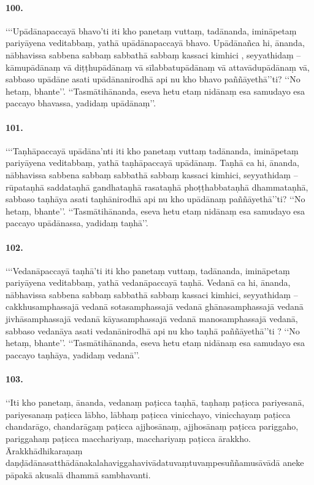 \paragraph{100.} ‘‘‘Upādānapaccayā bhavo’ti iti kho panetaṃ vuttaṃ, tadānanda, imināpetaṃ pariyāyena veditabbaṃ, yathā upādānapaccayā bhavo. Upādānañca hi, ānanda, nābhavissa sabbena sabbaṃ sabbathā sabbaṃ kassaci kimhici , seyyathidaṃ – kāmupādānaṃ vā diṭṭhupādānaṃ vā sīlabbatupādānaṃ vā attavādupādānaṃ vā, sabbaso upādāne asati upādānanirodhā api nu kho bhavo paññāyethā’’ti? ‘‘No hetaṃ, bhante’’. ‘‘Tasmātihānanda, eseva hetu etaṃ nidānaṃ esa samudayo esa paccayo bhavassa, yadidaṃ upādānaṃ’’.

\paragraph{101.} ‘‘‘Taṇhāpaccayā upādāna’nti iti kho panetaṃ vuttaṃ tadānanda, imināpetaṃ pariyāyena veditabbaṃ, yathā taṇhāpaccayā upādānaṃ. Taṇhā ca hi, ānanda, nābhavissa sabbena sabbaṃ sabbathā sabbaṃ kassaci kimhici, seyyathidaṃ – rūpataṇhā saddataṇhā gandhataṇhā rasataṇhā phoṭṭhabbataṇhā dhammataṇhā, sabbaso taṇhāya asati taṇhānirodhā api nu kho upādānaṃ paññāyethā’’ti? ‘‘No hetaṃ, bhante’’. ‘‘Tasmātihānanda, eseva hetu etaṃ nidānaṃ esa samudayo esa paccayo upādānassa, yadidaṃ taṇhā’’.

\paragraph{102.} ‘‘‘Vedanāpaccayā taṇhā’ti iti kho panetaṃ vuttaṃ, tadānanda, imināpetaṃ pariyāyena veditabbaṃ, yathā vedanāpaccayā taṇhā. Vedanā ca hi, ānanda, nābhavissa sabbena sabbaṃ sabbathā sabbaṃ kassaci kimhici, seyyathidaṃ – cakkhusamphassajā vedanā sotasamphassajā vedanā ghānasamphassajā vedanā jivhāsamphassajā vedanā kāyasamphassajā vedanā manosamphassajā vedanā, sabbaso vedanāya asati vedanānirodhā api nu kho taṇhā paññāyethā’’ti ? ‘‘No hetaṃ, bhante’’. ‘‘Tasmātihānanda, eseva hetu etaṃ nidānaṃ esa samudayo esa paccayo taṇhāya, yadidaṃ vedanā’’.

\paragraph{103.} ‘‘Iti kho panetaṃ, ānanda, vedanaṃ paṭicca taṇhā, taṇhaṃ paṭicca pariyesanā, pariyesanaṃ paṭicca lābho, lābhaṃ paṭicca vinicchayo, vinicchayaṃ paṭicca chandarāgo, chandarāgaṃ paṭicca ajjhosānaṃ, ajjhosānaṃ paṭicca pariggaho, pariggahaṃ paṭicca macchariyaṃ, macchariyaṃ paṭicca ārakkho. Ārakkhādhikaraṇaṃ daṇḍādānasatthādānakalahaviggahavivādatuvaṃtuvaṃpesuññamusāvādā aneke pāpakā akusalā dhammā sambhavanti.

